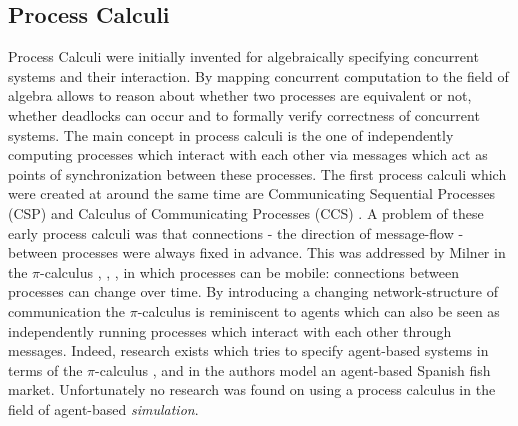 \subsection{Process Calculi}
Process Calculi were initially invented for algebraically specifying concurrent systems and their interaction. By mapping concurrent computation to the field of algebra allows to reason about whether two processes are equivalent or not, whether deadlocks can occur and to formally verify correctness of concurrent systems. The main concept in process calculi is the one of independently computing processes which interact with each other via messages which act as points of synchronization between these processes. The first process calculi which were created at around the same time are Communicating Sequential Processes (CSP) \cite{hoare_communicating_1985} and Calculus of Communicating Processes (CCS) \cite{milner_calculus_1980}. A problem of these early process calculi was that connections - the direction of message-flow - between processes were always fixed in advance. This was addressed by Milner in the $\pi$-calculus \cite{milner_calculus_1992}, \cite{milner_calculus_1992-1}, \cite{milner_elements_1993}, \cite{milner_communicating_1999} in which processes can be mobile: connections between processes can change over time. 
By introducing a changing network-structure of communication the $\pi$-calculus is reminiscent to agents which can also be seen as independently running processes which interact with each other through messages. Indeed, research exists which tries to specify agent-based systems in terms of the $\pi$-calculus \cite{esterline_using_2001}, \cite{kawabe_nepi2programming_2000} and in \cite{padget_pi-calculus_1998} the authors model an agent-based Spanish fish market. Unfortunately no research was found on using a process calculus in the field of agent-based \textit{simulation}.